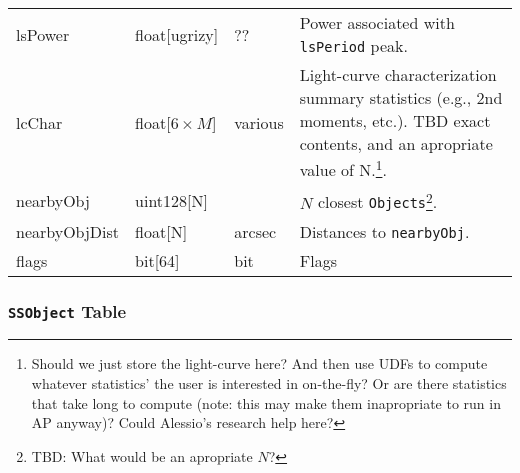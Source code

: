 \documentclass[12pt]{article}
\newcommand{\code}[1]{\texttt{#1}}
\newcommand{\Objects}{\code{Objects}\xspace}
\newcommand{\SSObject}{\code{SSObject}\xspace}
\begin{document}
\begin{center}
\begin{longtable}{p{3cm}p{2cm}p{2cm}p{5cm}}
lsPower   & float[ugrizy] & ?? & Power associated with \texttt{lsPeriod} peak. \\

lcChar   & float[$6\times{}M$] & various & Light-curve characterization summary statistics (e.g., 2nd moments, etc.). TBD exact contents, and an apropriate value of N.\footnote{Should we just store the light-curve here? And then use UDFs to compute whatever statistics' the user is interested in on-the-fly? Or are there statistics that take long to compute (note: this may make them inapropriate to run in AP anyway)? Could Alessio's research help here?}. \\

nearbyObj   & uint128[N] & ~ & $N$ closest \Objects\footnote{TBD: What would be an apropriate $N$?}. \\

nearbyObjDist   & float[N] & arcsec & Distances to \texttt{nearbyObj}. \\

flags & bit[64] & bit & Flags \\ \hline

\end{longtable}
\end{center}


\subsubsection{\SSObject Table}
\end{document}

